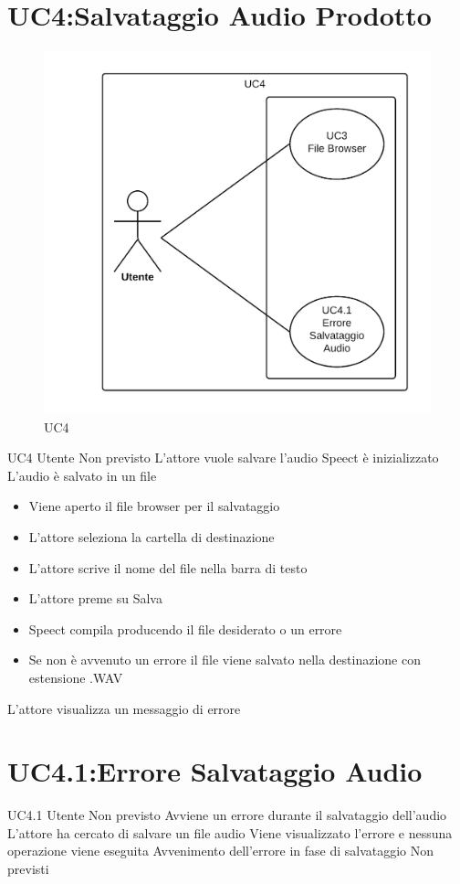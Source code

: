 \documentclass[../AnalisideiRequisiti.tex]{subfiles}
\begin{document}
\section{UC4:Salvataggio Audio Prodotto}
\begin{figure}[H]
	\caption{UC4}
	\centering
	\includegraphics[width=\textwidth]{../img/UC04.png}
\end{figure}
\UserCase
{UC4}
{Utente}
{Non previsto}
{L'attore vuole salvare l'audio}
{Speect è inizializzato }
{L'audio è salvato in un file}
{
		\begin{itemize}
		\item{} Viene aperto il file browser per il salvataggio 
		\item{} L'attore seleziona la cartella di destinazione 
		\item{} L'attore scrive il nome del file nella barra di testo
		\item{} L'attore preme su Salva 
		\item{} Speect compila producendo il file desiderato o un errore  
		\item{} Se non è avvenuto un errore il file viene salvato nella destinazione con estensione .WAV
		\end{itemize}
}
{L'attore visualizza un messaggio di errore }		
\section{UC4.1:Errore Salvataggio Audio}
\UserCase
{UC4.1}
{Utente}
{Non previsto}
{Avviene un errore durante il salvataggio dell'audio}
{L'attore ha cercato di salvare un file audio}
{Viene visualizzato l'errore e nessuna operazione viene eseguita}
{Avvenimento dell'errore in fase di salvataggio}
{Non previsti}
\end{document}
